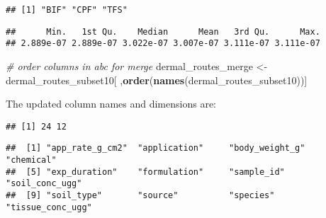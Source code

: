 \documentclass[
]{article}
\newenvironment{Shaded}{\begin{snugshade}}{\end{snugshade}}
\newcommand{\CommentTok}[1]{\textcolor[rgb]{0.56,0.35,0.01}{\textit{#1}}}
\newcommand{\FloatTok}[1]{\textcolor[rgb]{0.00,0.00,0.81}{#1}}
\newcommand{\KeywordTok}[1]{\textcolor[rgb]{0.13,0.29,0.53}{\textbf{#1}}}
\newcommand{\NormalTok}[1]{#1}
\newcommand{\OperatorTok}[1]{\textcolor[rgb]{0.81,0.36,0.00}{\textbf{#1}}}
\newcommand{\StringTok}[1]{\textcolor[rgb]{0.31,0.60,0.02}{#1}}
\begin{document}
\begin{verbatim}
## [1] "BIF" "CPF" "TFS"
\end{verbatim}

\begin{Shaded}
\end{Shaded}

\begin{verbatim}
##      Min.   1st Qu.    Median      Mean   3rd Qu.      Max. 
## 2.889e-07 2.889e-07 3.022e-07 3.007e-07 3.111e-07 3.111e-07
\end{verbatim}

\begin{Shaded}
\begin{Highlighting}[]
\CommentTok{# order columns in abc for merge}
\NormalTok{dermal_routes_merge <-}\StringTok{ }\NormalTok{dermal_routes_subset10[ ,}\KeywordTok{order}\NormalTok{(}\KeywordTok{names}\NormalTok{(dermal_routes_subset10))]}
\end{Highlighting}
\end{Shaded}

The updated column names and dimensions are:

\begin{verbatim}
## [1] 24 12
\end{verbatim}

\begin{verbatim}
##  [1] "app_rate_g_cm2"  "application"     "body_weight_g"   "chemical"       
##  [5] "exp_duration"    "formulation"     "sample_id"       "soil_conc_ugg"  
##  [9] "soil_type"       "source"          "species"         "tissue_conc_ugg"
\end{verbatim}
\end{document}
